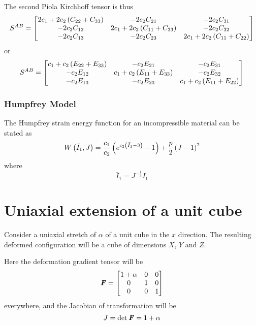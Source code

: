 The second Piola Kirchhoff tensor is thus
\begin{equation}
  S^{AB}=\begin{bmatrix}
    2c_{1}+2c_{2}\left( C_{22}+C_{33} \right) & -2c_{2}C_{21} & -2c_{2}C_{31} \\
    -2c_{2}C_{12} & 2c_{1}+2c_{2}\left( C_{11}+C_{33} \right) & -2c_{2}C_{32} \\
    -2c_{2}C_{13} & -2c_{2}C_{23} & 2c_{1}+2c_{2}\left( C_{11}+C_{22} \right)
  \end{bmatrix}
\end{equation}
or
\begin{equation}
  S^{AB}=\begin{bmatrix}
    c_{1}+c_{2}\left( E_{22}+E_{33} \right) & -c_{2}E_{21} & -c_{2}E_{31} \\
    -c_{2}E_{12} & c_{1}+c_{2}\left( E_{11}+E_{33} \right) & -c_{2}E_{32} \\
    -c_{2}E_{13} & -c_{2}E_{23} & c_{1}+c_{2}\left( E_{11}+E_{22} \right)
  \end{bmatrix}
\end{equation}

\subsubsection{Humpfrey Model}

The Humpfrey strain energy function for an incompressible material can be
stated as
\begin{equation}
   W\left( \bar{I}_{1},J \right) =\dfrac{c_{1}}{c_{2}}\left( e^{c_{2}\left( \bar{I}_{1}-3 \right)}-1 \right)+\dfrac{p}{2}\left( J-1 \right)^{2}
\end{equation}
where
\begin{equation}
  \bar{I}_{1}=J^{-\frac{1}{3}}I_{1}
\end{equation}


\section{Uniaxial extension of a unit cube}

Consider a uniaxial stretch of $\alpha$ of a unit cube in the $x$
direction. The resulting deformed configuration will be a cube of dimensions
$X$, $Y$ and $Z$.

Here the deformation gradient tensor will be
\begin{equation}
  \boldsymbol{\mathit{F}}= \begin{bmatrix}
    1+\alpha & 0 & 0 \\
    0 & 1 & 0 \\
    0 & 0 & 1
  \end{bmatrix}
\end{equation}
everywhere, and the Jacobian of transformation will be 
\begin{equation}
  J = \det{\ensuremath{\boldsymbol{\mathit{F}}}}=1+\alpha
\end{equation}

